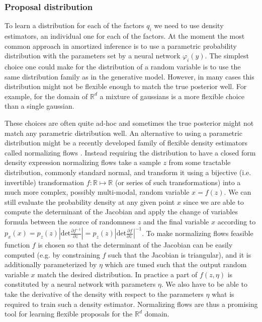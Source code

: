 \documentclass[12pt]{article}
\begin{document}




\subsubsection*{Proposal distribution}

To learn a distribution for each of the factors $q_i$ we need to use density estimators, an individual one for each of the factors.
At the moment the most common approach in amortized inference is to use a parametric probability distribution with the parameters set by a neural network $\varphi_i(y)$.
The simplest choice one could make for the distribution of a random variable is to use the same distribution family as in the generative model.
However, in many cases this distribution might not be flexible enough to match the true posterior well.
For example, for the domain of $\mathbb{R}^d$ a mixture of gaussians is a more flexible choice than a single gaussian.

These choices are often quite ad-hoc and sometimes the true posterior might not match any parametric distribution well.
An alternative to using a parametric distribution might be a recently developed family of flexible density estimators called normalizing flows \citep{RezendeMohamed2015,IAF,MAF}.
Instead requiring the distribution to have a closed form density expression normalizing flows take a sample $z$ from some tractable distribution, commonly standard normal, and transform it using a bijective (i.e. invertible) transformation $f: \mathbb{R} \mapsto \mathbb{R}$ (or series of such transformations) into a much more complex, possibly multi-modal, random variable $x=f(z)$.
We can still evaluate the probability density at any given point $x$ since we are able to compute the determinant of the Jacobian and apply the change of variables formula between the source of randomness $z$ and the final variable $x$ according to 
$p_x(x) = p_z(z) \left|
    \mathrm{det} \frac{
      \partial f^{-1}
    }{
      \partial z\
    }
  \right|
  = p_z(z) \left|
    \mathrm{det} \frac{
      \partial f
    }{
      \partial z\
    }
  \right| ^{-1}$.
To make normalizing flows feasible function $f$ is chosen so that the determinant of the Jacobian can be easily computed (e.g. by constraining $f$ such that the Jacobian is triangular), and it is additionally parameterized by $\eta$ which are tuned such that the output random variable $x$ match the desired distribution. In practice a part of $f(z, \eta)$ is constituted by a neural network with parameters $\eta$.
We also have to be able to take the derivative of the density with respect to the parameters $\eta$ what is required to train such a density estimator.
Normalizing flows are thus a promising tool for learning flexible proposals for the $\mathbb{R}^d$ domain.
\end{document}
